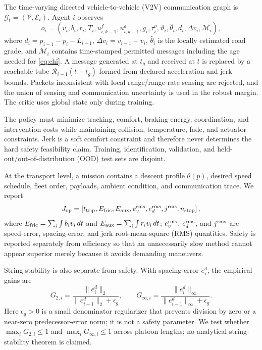 The time-varying directed vehicle-to-vehicle (V2V) communication graph is $\mathcal G_t=(\mathcal V,\mathcal E_t)$. Agent $i$ observes
\begin{equation}
o_i=(v_i,b_i,r_i,T_i,u^f_{i,k-1},u^a_{i,k-1},g_i,\tau_i^g,
\vartheta_i,\hat\theta_i,d_i,\Delta v_i,
\mathcal M_i),
\end{equation}
where $d_i=p_{i-1}-p_i-L_{i-1}$, $\Delta v_i=v_{i-1}-v_i$, $\hat\theta_i$ is the locally estimated road grade, and $\mathcal M_i$ contains time-stamped permitted messages including the age needed for \eqref{eq:chi}. A message generated at $t_g$ and received at $t$ is replaced by a reachable tube $\mathcal R_{i-1}(t-t_g)$ formed from declared acceleration and jerk bounds. Packets inconsistent with local range/range-rate sensing are rejected, and the union of sensing and communication uncertainty is used in the robust margin. The critic uses global state only during training.

The policy must minimize tracking, comfort, braking-energy, coordination, and intervention costs while maintaining collision, temperature, fade, and actuator constraints. Jerk is a soft comfort constraint and therefore never determines the hard safety feasibility claim. Training, identification, validation, and held-out/out-of-distribution (OOD) test sets are disjoint.

At the transport level, a mission contains a descent profile $\theta(p)$, desired speed schedule, fleet order, payloads, ambient condition, and communication trace. We report
\begin{equation}
J_{\rm op}=\left[t_{\rm trip},E_{\rm fric},E_{\rm aux},e_v^{\rm rms},
e_d^{\rm rms},j^{\rm rms},n_{\rm stop}\right],
\end{equation}
where $E_{\rm fric}=\sum_i\int b_iv_i\,dt$ and $E_{\rm aux}=\sum_i\int r_iv_i\,dt$; $e_v^{\rm rms}$, $e_d^{\rm rms}$, and $j^{\rm rms}$ are speed-error, spacing-error, and jerk root-mean-square (RMS) quantities. Safety is reported separately from efficiency so that an unnecessarily slow method cannot appear superior merely because it avoids demanding maneuvers.

String stability is also separate from safety. With spacing error $e_i^d$, the empirical gains are
\begin{equation}
G_{2,i}=\frac{\|e_i^d\|_2}{\|e_{i-1}^d\|_2+\epsilon_g},\qquad
G_{\infty,i}=\frac{\|e_i^d\|_\infty}{\|e_{i-1}^d\|_\infty+\epsilon_g}.
\end{equation}
Here $\epsilon_g>0$ is a small denominator regularizer that prevents division by zero or a near-zero predecessor-error norm; it is not a safety parameter. We test whether $\max_iG_{2,i}\le1$ and $\max_iG_{\infty,i}\le1$ across platoon lengths; no analytical string-stability theorem is claimed.

